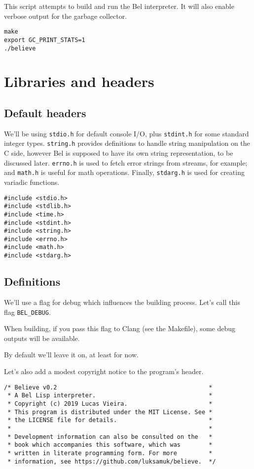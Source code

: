 \documentclass[openright,a4paper,twoside,12pt]{memoir}
\begin{document}
This script attempts to build and run the Bel interpreter. It will
also enable verbose output for the garbage collector.

\begin{verbatim}
make
export GC_PRINT_STATS=1
./believe
\end{verbatim}

\chapter{Libraries and headers}
\label{sec:orgf5a5671}

\section{Default headers}
\label{sec:orgf5672c7}

We'll be using \texttt{stdio.h} for default console I/O, plus \texttt{stdint.h} for some
standard integer types. \texttt{string.h} provides definitions to handle string
manipulation on the C side, however Bel is supposed to have its own
string representation, to be discussed later. \texttt{errno.h} is used to fetch
error strings from streams, for example; and \texttt{math.h} is useful for math
operations. Finally, \texttt{stdarg.h} is used for creating variadic
functions.

\begin{verbatim}
#include <stdio.h>
#include <stdlib.h>
#include <time.h>
#include <stdint.h>
#include <string.h>
#include <errno.h>
#include <math.h>
#include <stdarg.h>
\end{verbatim}

\section{Definitions}
\label{sec:orge24adac}

We'll use a flag for debug which influences the building
process. Let's call this flag \texttt{BEL\_DEBUG}.

When building, if you pass this flag to Clang (see the Makefile), some
debug outputs will be available.

By default we'll leave it on, at least for now.

Let's also add a modest copyright notice to the program's header.

\begin{verbatim}
/* Believe v0.2                                           *
 * A Bel Lisp interpreter.                                *
 * Copyright (c) 2019 Lucas Vieira.                       *
 * This program is distributed under the MIT License. See *
 * the LICENSE file for details.                          *
 *                                                        *
 * Development information can also be consulted on the   *
 * book which accompanies this software, which was        * 
 * written in literate programming form. For more         *
 * information, see https://github.com/luksamuk/believe.  */
\end{verbatim}
\end{document}
